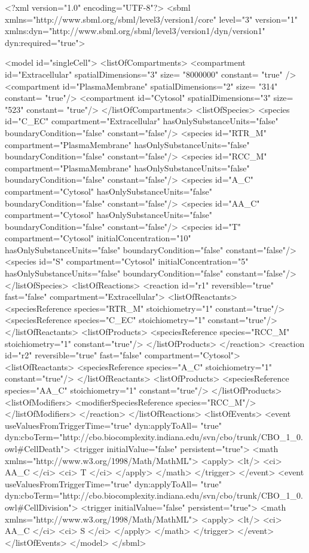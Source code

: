 \begin{example}
<?xml version="1.0" encoding="UTF-8"?>
<sbml xmlns="http://www.sbml.org/sbml/level3/version1/core" level="3" version="1"
	  xmlns:dyn="http://www.sbml.org/sbml/level3/version1/dyn/version1" dyn:required="true">

	<model id="singleCell">
		<listOfCompartments>
			<compartment id="Extracellular" spatialDimensions="3" size= "8000000" constant= "true" />
			<compartment id="PlasmaMembrane" spatialDimensions="2" size= "314" constant= "true"/>
			<compartment id="Cytosol" spatialDimensions="3" size= "523" constant= "true"/>
		</listOfCompartments>
		<listOfSpecies>
			<species id="C_EC" compartment="Extracellular" hasOnlySubstanceUnits="false" 
							  boundaryCondition="false" constant="false"/>
			<species id="RTR_M" compartment="PlasmaMembrane" hasOnlySubstanceUnits="false" 
								boundaryCondition="false" constant="false"/>
			<species id="RCC_M" compartment="PlasmaMembrane" hasOnlySubstanceUnits="false" 
								boundaryCondition="false" constant="false"/>
			<species id="A_C" compartment="Cytosol" hasOnlySubstanceUnits="false" 
								boundaryCondition="false" constant="false"/>
			<species id="AA_C" compartment="Cytosol" hasOnlySubstanceUnits="false" 
								boundaryCondition="false" constant="false"/>
			<species id="T" compartment="Cytosol" initialConcentration="10" hasOnlySubstanceUnits="false" 
								boundaryCondition="false" constant="false"/>
			<species id="S" compartment="Cytosol" initialConcentration="5" hasOnlySubstanceUnits="false" 
								boundaryCondition="false" constant="false"/>
		</listOfSpecies>
		<listOfReactions>
			<reaction id="r1" reversible="true" fast="false" compartment="Extracellular">
				<listOfReactants>
					<speciesReference species="RTR_M" stoichiometry="1" constant="true"/>
					<speciesReference species="C_EC" stoichiometry="1" constant="true"/>
				</listOfReactants>
				<listOfProducts>
					<speciesReference species="RCC_M" stoichiometry="1" constant="true"/>
				</listOfProducts>
			</reaction>
			<reaction id="r2" reversible="true" fast="false" compartment="Cytosol">
				<listOfReactants>
					<speciesReference species="A_C" stoichiometry="1" constant="true"/>
				</listOfReactants>
				<listOfProducts>
					<speciesReference species="AA_C" stoichiometry="1" constant="true"/>
				</listOfProducts>
				<listOfModifiers>
					<modifierSpeciesReference species="RCC_M"/>
				</listOfModifiers>
			</reaction>
		</listOfReactions>
		<listOfEvents>
			<event useValuesFromTriggerTime="true" dyn:applyToAll= "true"
			       dyn:cboTerm="http://cbo.biocomplexity.indiana.edu/svn/cbo/trunk/CBO_1_0.owl#CellDeath">
				<trigger initialValue="false" persistent="true">
					<math xmlns="http://www.w3.org/1998/Math/MathML">
						<apply> <lt/> <ci> AA_C </ci> <ci> T </ci> </apply>
					</math>
				</trigger>
			</event>
			<event useValuesFromTriggerTime="true" dyn:applyToAll= "true"
			     dyn:cboTerm="http://cbo.biocomplexity.indiana.edu/svn/cbo/trunk/CBO_1_0.owl#CellDivision">
				<trigger initialValue="false" persistent="true">
					<math xmlns="http://www.w3.org/1998/Math/MathML">
						<apply> <lt/> <ci> AA_C </ci> <ci> S </ci> </apply>
					</math>
				</trigger>
			</event>	
		</listOfEvents>
	</model>
</sbml>
\end{example}

